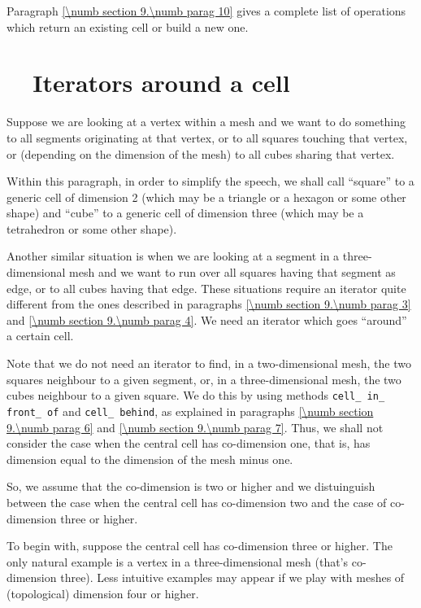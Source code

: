 Paragraph \ref{\numb section 9.\numb parag 10} gives a complete list of operations which return
an existing cell or build a new one.


\section{~~Iterators around a cell}\label{\numb section 9.\numb parag 8}

Suppose we are looking at a vertex within a mesh and we want to do something to all segments
originating at that vertex, or to all squares touching that vertex, or (depending on the
dimension of the mesh) to all cubes sharing that vertex.

Within this paragraph, in order to simplify the speech, we shall call ``square'' to a generic
cell of dimension 2 (which may be a triangle or a hexagon or some other shape) and
``cube'' to a generic cell of dimension three (which may be a tetrahedron or some other shape).

Another similar situation is when we are looking at a segment in a three-dimensional mesh
and we want to
run over all squares having that segment as edge, or to all cubes having that edge.
These situations require an iterator quite different from the ones described in paragraphs
\ref{\numb section 9.\numb parag 3} and \ref{\numb section 9.\numb parag 4}.
We need an iterator which goes ``around'' a certain cell.

Note that we do not need an iterator to find, in a two-dimensional mesh, the two squares
neighbour to a given segment, or, in a three-dimensional mesh, the two cubes neighbour to
a given square.
We do this by using methods {\small\tt cell\_\,in\_\,front\_\,of} and {\small\tt cell\_\,behind},
as explained in paragraphs \ref{\numb section 9.\numb parag 6} and
\ref{\numb section 9.\numb parag 7}.
Thus, we shall not consider the case when the central cell has co-dimension one, that is,
has dimension equal to the dimension of the mesh minus one.

So, we assume that the co-dimension is two or higher and we distuinguish between
the case when the central cell has co-dimension two and the case of co-dimension
three or higher.

To begin with, suppose the central cell has co-dimension three or higher.
The only natural example is a vertex in a three-dimensional mesh (that's co-dimension three).
Less intuitive examples may appear if we play with meshes of (topological) dimension
four or higher.

